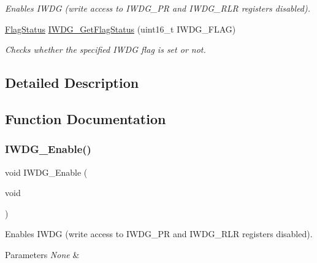 \begin{DoxyCompactItemize}
\begin{DoxyCompactList}\small\item\em Enables I\+W\+DG (write access to I\+W\+D\+G\+\_\+\+PR and I\+W\+D\+G\+\_\+\+R\+LR registers disabled). \end{DoxyCompactList}\item 
\mbox{\hyperlink{group___exported__types_ga89136caac2e14c55151f527ac02daaff}{Flag\+Status}} \mbox{\hyperlink{group___i_w_d_g___exported___functions_ga37f050cfbedc0c15f9e0816c0b22011e}{I\+W\+D\+G\+\_\+\+Get\+Flag\+Status}} (uint16\+\_\+t I\+W\+D\+G\+\_\+\+F\+L\+AG)
\begin{DoxyCompactList}\small\item\em Checks whether the specified I\+W\+DG flag is set or not. \end{DoxyCompactList}\end{DoxyCompactItemize}


\subsection{Detailed Description}


\subsection{Function Documentation}
\mbox{\label{group___i_w_d_g___exported___functions_ga479b2921c86f8c67b819f5c4bea6bdb6}} 
\subsubsection{\texorpdfstring{IWDG\_Enable()}{IWDG\_Enable()}}
{\footnotesize\ttfamily void I\+W\+D\+G\+\_\+\+Enable (\begin{DoxyParamCaption}\item[{void}]{ }\end{DoxyParamCaption})}



Enables I\+W\+DG (write access to I\+W\+D\+G\+\_\+\+PR and I\+W\+D\+G\+\_\+\+R\+LR registers disabled). 


\begin{DoxyParams}{Parameters}
{\em None} & \\
\hline
\end{DoxyParams}

